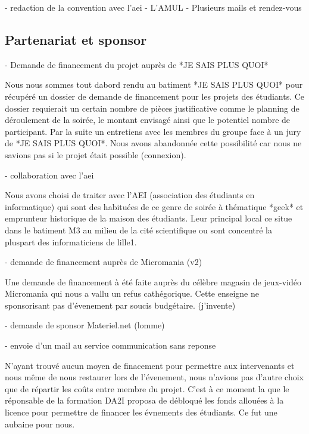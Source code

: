 - redaction de la convention avec l'aei
- L'AMUL
- Plusieurs mails et rendez-vous

\subsection{Partenariat et sponsor} %
\label{sub:partenariat_et_sponsor}

- Demande de financement du projet auprès de *JE SAIS PLUS QUOI*

  Nous nous sommes tout dabord rendu au batiment *JE SAIS PLUS QUOI*
  pour récupéré un dossier de demande de financement pour les projets des
  étudiants. Ce dossier requierait un certain nombre de pièces
  justificative comme le planning de déroulement de la soirée, le montant
  envisagé ainsi que le potentiel nombre de participant. Par la suite un
  entretiens avec les membres du groupe face à un jury de *JE SAIS
  PLUS QUOI*. Nous avons abandonnée cette possibilité car nous ne savions
  pas si le projet était possible (connexion).

- collaboration avec l'aei

  Nous avons choisi de traiter avec l'AEI (association des étudiants
  en informatique) qui sont des habituées de ce genre de soirée à
  thématique *geek* et emprunteur historique de la maison des étudiants.
  Leur principal local ce situe dans le batiment M3 au milieu de la
  cité scientifique ou sont concentré la pluspart des informaticiens de
  lille1.

- demande de financement auprès de Micromania (v2)

  Une demande de financement à été faite auprès du célèbre magasin de
  jeux-vidéo Micromania qui nous a vallu un refus cathégorique. Cette
  enseigne ne sponsorisant pas d'évenement par soucis
  budgétaire. (j'invente)

- demande de sponsor Materiel.net (lomme)

- envoie d'un mail au service communication sans reponse

  N'ayant trouvé aucun moyen de finacement pour permettre aux
  intervenants et nous même de nous restaurer lors de l'évenement, nous
  n'avions pas d'autre choix que de répartir les coûts entre membre du
  projet. C'est à ce moment la que le réponsable de la formation DA2I
  proposa de débloqué les fonds allouées à la licence pour permettre de
  financer les évnements des étudiants. Ce fut une aubaine pour nous.

